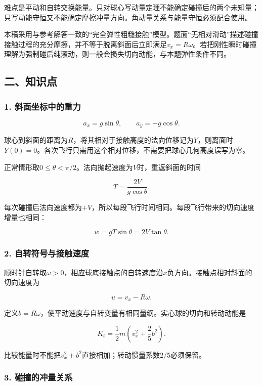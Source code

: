 \documentclass[12pt,a4paper,fontset=fandol]{ctexart}
\begin{document}
难点是平动和自转交换能量。只对球心写动量定理不能确定碰撞后的两个未知量；只写动能守恒又不能确定摩擦冲量方向。角动量关系与能量守恒必须配合使用。

本稿采用与参考解答一致的``完全弹性粗糙接触''模型。题面``无相对滑动''描述碰撞接触过程的充分摩擦，并不等于脱离斜面后立即满足\(v_x=R\omega\)。若把刚性瞬时碰撞理解为强制碰后纯滚动，则一般会损失切向动能，与本题弹性条件不同。

\subsection{二、知识点}\label{ux4e8cux77e5ux8bc6ux70b9-2}

\subsubsection{1.
斜面坐标中的重力}\label{ux659cux9762ux5750ux6807ux4e2dux7684ux91cdux529b}

\[
a_x=g\sin\theta,\qquad a_y=-g\cos\theta.
\]

球心到斜面的距离为\(R\)，将其相对于接触高度的法向位移记为\(Y\)，则离面时\(Y(0)=0\)。各次飞行只需用这个相对位移，不需要把球心几何高度误写为零。

正常情形取\(0\leq\theta<\pi/2\)。法向抛起速度为\(V\)时，重返斜面的时间

\[
T=\frac{2V}{g\cos\theta}.
\]

每次碰撞后法向速度都为\(+V\)，所以每段飞行时间相同。每段飞行带来的切向速度增量也相同：

\[
w=gT\sin\theta=2V\tan\theta.
\]

\subsubsection{2.
自转符号与接触速度}\label{ux81eaux8f6cux7b26ux53f7ux4e0eux63a5ux89e6ux901fux5ea6}

顺时针自转取\(\omega>0\)，相应球底接触点的自转速度沿\(x\)负方向。接触点相对斜面的切向速度为

\[
u=v_x-R\omega.
\]

定义\(b=R\omega\)，使平动速度与自转变量有相同量纲。实心球的切向和转动动能是

\[
K_t=\frac12m\left(v_x^2+\frac25b^2\right).
\]

比较能量时不能把\(v_x^2+b^2\)直接相加；转动惯量系数\(2/5\)必须保留。

\subsubsection{3.
碰撞的冲量关系}\label{ux78b0ux649eux7684ux51b2ux91cfux5173ux7cfb}
\end{document}
